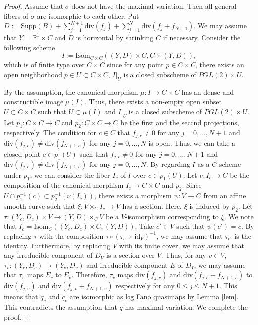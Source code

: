 \documentclass[12pt,twoside]{amsart}
\theoremstyle{definition}
\begin{document}
    \begin{proof}
    Assume that $\sigma$ does not have the maximal variation.
    Then all general fibers of $\sigma$ are isomorphic to each other.
    Put $D:=\mathrm{Supp}(B)+\sum_{j=1}^{N+1}\mathrm{div}(f_j)+\sum_{j=1}^N\mathrm{div}(f_j+f_{N+1})$. 
    We may assume that $Y=\mathbb{P}^1\times C$ and $D$ is horizontal by shrinking $C$ if necessary.
    Consider the following scheme 
    $$I:=\mathrm{Isom}_{C\times C}((Y,D)\times C,C\times (Y,D)),$$
    which is of finite type over $C\times C$ since for any point $p\in C\times C$, there exists an open neighborhood $p\in U\subset C\times C$, $I|_U$ is a closed subscheme of $ PGL(2)\times U$.

    By the assumption, the canonical morphism $\mu\colon I\to C\times C$ has an dense and constructible image $\mu(I)$. 
    Thus, there exists a non-empty open subset $U\subset C\times C$ such that $U\subset \mu(I)$ and $I|_U$ is a closed subscheme of $ PGL(2)\times U$.
    Let $p_1\colon C\times C\to C$ and $p_2\colon C\times C\to C$ be the first and the second projections, respectively.
    The condition for $c\in C$ that $f_{j,c}\ne0$ for any $j=0,\ldots,N+1$ and $\mathrm{div}(f_{j,c})\ne\mathrm{div}(f_{N+1,c})$ for any $j=0,\ldots,N$ is open.
    Thus, we can take a closed point $c\in p_1(U)$ such that $f_{j,c}\ne0$ for any $j=0,\ldots,N+1$ and $\mathrm{div}(f_{j,c})\ne\mathrm{div}(f_{N+1,c})$ for any $j=0,\ldots,N$.
    By regarding $I$ as a $C$-scheme under $p_1$, we can consider the fiber $I_c$ of $I$ over $c\in p_1(U)$.
    Let $\nu\colon I_c\to C$ be the composition of the canonical morphism $I_c\to C\times C$ and $p_2$.
    Since $U\cap p_1^{-1}(c)\subset p_2^{-1}(\nu(I_c))$, there exists a morphism $\psi\colon V\to C$ from an affine smooth curve such that $\xi\colon V\times_CI_c\to V$ has a section. 
    Here, $\xi$ is induced by $p_2$.
    Let $\tau\colon (Y_c,D_c)\times V\to (Y,D)\times_{C}V$ be a $V$-isomorphism corresponding to $\xi$. 
    We note that $I_c=\mathrm{Isom}_C((Y_c,D_c)\times C,(Y,D))$.
    Take $c'\in V$ such that $\psi(c')=c$.
    By replacing $\tau$ with the composition $\tau\circ(\tau_{c'}\times\mathrm{id}_{V})^{-1}$, we may assume that $\tau_{c'}$ is the identity.
    Furthermore, by replacing $V$ with its finite cover, we may assume that any irreducible component of $D_V$ is a section over $V$.
    Thus, for any $v\in V$, $\tau_{v}\colon (Y_c,D_c)\to (Y_v,D_v)$ and irreducible component $E$ of $D_V$, we may assume that $\tau_v$ maps $E_c$ to $E_v$.
    Therefore, $\tau_v$ maps $\mathrm{div}(f_{j,c})$ and $\mathrm{div}(f_{j,c}+f_{N+1,c})$ to $\mathrm{div}(f_{j,v})$ and $\mathrm{div}(f_{j,v}+f_{N+1,v})$ respectively for any $0\le j\le N+1$.
This means 
that $q_c$ and $q_v$ are isomorphic as log Fano quasimaps by Lemma \ref{lem}.
This contradicts the assumption that $q$ has maximal variation.
We complete the proof.
    \end{proof}
\end{document}
